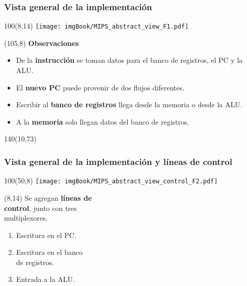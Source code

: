\documentclass[aspectratio=169]{beamer}
\begin{document}
\begin{frame}[t,fragile]
    \frametitle{Vista general de la implementación}
    \begin{textblock}{100}(8,14)
    \texttt{[image: imgBook/MIPS\_abstract\_view\_F1.pdf]}
    \end{textblock}
    \begin{textblock}{45}(105,8)
    \textbf{Observaciones}\\
    \small
    \begin{itemize}
    \item<2-> De la \textbf{instrucción} se toman datos para el banco de registros, el PC y la ALU.
    \item<3-> El \textbf{nuevo PC} puede provenir de dos flujos diferentes.
    \item<4-> Escribir al \textbf{banco de registros} llega desde la memoria o desde la ALU.
    \item<5-> A la \textbf{memoria} solo llegan datos del banco de registros.
    \end{itemize}
    \end{textblock}
    \begin{textblock}{140}(10,73)
    \end{textblock}
\end{frame}

\begin{frame}[t,fragile]
    \frametitle{Vista general de la implementación y líneas de control}
    \begin{textblock}{100}(50,8)
    \texttt{[image: imgBook/MIPS\_abstract\_view\_control\_F2.pdf]}
    \end{textblock}
    \begin{textblock}{65}(8,14)
    Se agregan \textbf{líneas de\\ control},
    junto con tres\\ multiplexores.
    \small
    \begin{enumerate}
    \setlength\itemsep{0cm}
    \item<2-> Escritura en el PC.
    \item<2-> Escritura en el banco\\ de registros.
    \item<2-> Entrada a la ALU.
    \end{enumerate}
    \bigskip
    \\
    \bigskip
    \\
    \end{textblock}
\end{frame}
\end{document}
